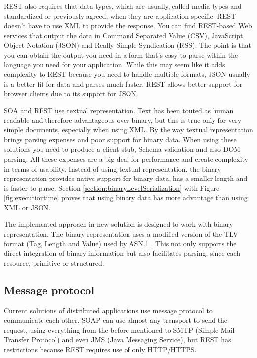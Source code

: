 REST also requires that data types, which are usually, called media types and standardized or previously agreed, when they are application specific. REST doesn’t have to use XML to provide the response. You can find REST-based Web services that output the data in Command Separated Value (CSV), JavaScript Object Notation (JSON) and Really Simple Syndication (RSS). The point is that you can obtain the output you need in a form that’s easy to parse within the language you need for your application. While this may seem like it adds complexity to REST because you need to handle multiple formats, JSON usually is a better fit for data and parses much faster. REST allows better support for browser clients due to its support for JSON.

SOA and REST use textual representation. Text has been touted as human readable and therefore advantageous over binary, but this is true only for very simple documents, especially when using XML. By the way textual representation brings parsing expenses and poor support for binary data. When using these solutions you need to produce a client stub, Schema validation and also DOM parsing. All these expenses are a big deal for performance and create complexity in terms of usability. Instead of using textual representation, the binary representation provides native support for binary data, has a smaller length and is faster to parse. Section \ref{section:binaryLevelSerialization} with Figure \ref{fig:executiontime} proves that using binary data has more advantage than using XML or JSON.

The implemented approach in new solution is designed to work with binary representation. The binary representation uses a modified version of the TLV format (Tag, Length and Value) used by ASN.1 \citep{asn1:opt}. This not only supports the direct integration of binary information but also facilitates parsing, since each resource, primitive or structured.

\subsection{Message protocol}
\label{section:mprotocol}

Current solutions of distributed applications use message protocol to communicate each other. SOAP can use almost any transport to send the request, using everything from the before mentioned to SMTP (Simple Mail Transfer Protocol) and even JMS (Java Messaging Service), but REST has restrictions because REST requires use of only HTTP/HTTPS.

